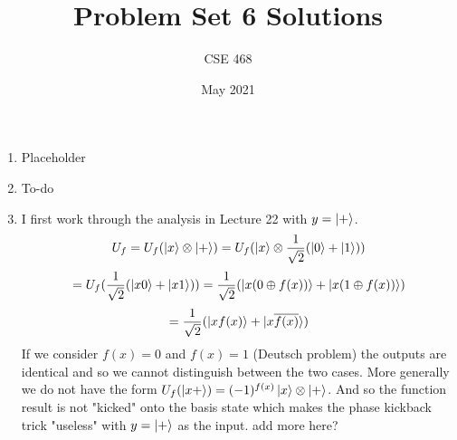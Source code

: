 \documentclass[12pt]{article}
\title{Problem Set 6 Solutions}
\author{CSE 468}
\date{May 2021}
\begin{document}
\maketitle

\begin{enumerate}[font=\bfseries]
    \item Placeholder
    \item To-do
    \item I first work through the analysis in Lecture 22 with $y=\ket{+}$.
    \[U_f = U_f(\ket{x}\otimes\ket{+}) = U_f(\ket{x}\otimes\frac{1}{\sqrt{2}}(\ket{0}+\ket{1}))\]
    \[=U_f(\frac{1}{\sqrt{2}}(\ket{x0}+\ket{x1})) = 
    \frac{1}{\sqrt{2}}(\ket{x(0\oplus f(x))}+ \ket{x(1\oplus f(x))})\]
    \[= \frac{1}{\sqrt{2}}(\ket{xf(x)}+\ket{x\overline{f(x)}})\]
    If we consider $f(x) = 0$ and $f(x) = 1$ (Deutsch problem) the outputs are identical and so we cannot distinguish between the two cases. More generally we do not have the form $U_f(\ket{x+}) = (-1)^{f(x)} \ket{x} \otimes \ket{+}$. And so the function result is not "kicked" onto the basis state which makes the phase kickback trick "useless" with $y = \ket{+}$ as the input. add more here?
\end{enumerate}
\end{document}
